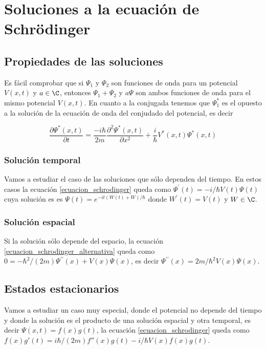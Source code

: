 \section{Soluciones a la ecuación de Schrödinger}
\subsection{Propiedades de las soluciones}
Es fácil comprobar que si $\Psi_1$ y $\Psi_2$ son funciones de onda para un potencial $V(x,t)$ y $a\in\C$, entonces $\Psi_1+\Psi_2$ y $a\Psi$ son ambos funciones de onda para el mismo potencial $V(x,t)$. En cuanto a la conjugada tenemos que $\Psi^*_1$ es el opuesto a la solución de la ecuación de onda del conjudado del potencial, es decir

\begin{equation}\label{ecuacion_schrodinger_conjugada}
\frac{\partial\Psi^*(x,t)}{\partial t}=\frac{-i\hbar}{2m}\frac{\partial^2\Psi^*(x,t)}{\partial x^2}+\frac{i}{\hbar}V^*(x,t)\Psi^*(x,t)
\end{equation}

\subsubsection{Solución temporal}
Vamos a estudiar el caso de las soluciones que sólo dependen del tiempo. En estos casos la ecuación \ref{ecuacion_schrodinger} queda como $\Psi^\prime(t) = -i/\hbar V(t)\Psi(t)$ cuya solución es es $\Psi(t)=e^{-it(W(t)+W)/\hbar}$ donde $W^\prime (t)=V(t)$ y $W\in\C$.

\subsubsection{Solución espacial}
Si la solución sólo depende del espacio, la ecuación \ref{ecuacion_schrodinger_alternativa} queda como $0=-\hbar^2/(2m)\Psi^{\prime\prime}(x)+V(x)\Psi(x)$, es decir $\Psi^{\prime\prime}(x)=2m/\hbar^2 V(x)\Psi(x)$.

\subsection{Estados estacionarios}
Vamos a estudiar un caso muy especial, donde el potencial no depende del tiempo y donde la solución es el producto de una solución espacial y otra temporal, es decir $\Psi(x,t)=f(x)g(t)$, la ecuación \ref{ecuacion_schrodinger} queda como $f(x)g'(t)=i\hbar/(2m)f''(x)g(t)-i/\hbar V(x)f(x)g(t)$.


